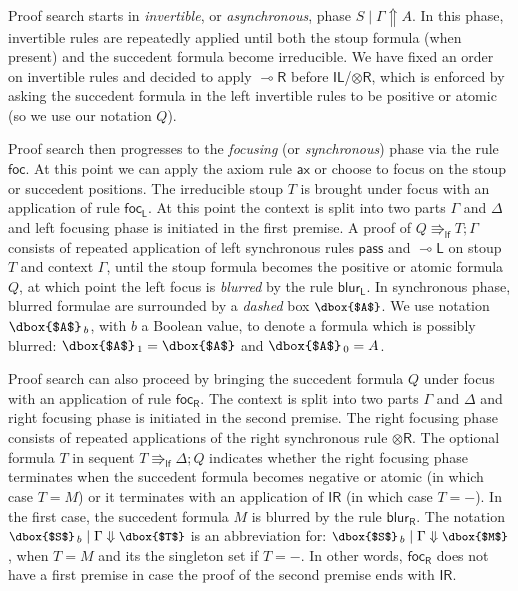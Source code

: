 \documentclass[runningheads]{llncs}
\newcommand{\tr}{\otimes \mathsf{R}}
\newcommand{\lright}{{\multimap}\mathsf{R}}
\newcommand{\lleft}{{\multimap}\mathsf{L}}
\newcommand{\pass}{\mathsf{pass}}
\newcommand{\unitl}{\mathsf{IL}}
\newcommand{\unitr}{\mathsf{IR}}
\newcommand{\otR}{\tr}
\newcommand{\lolliR}{\lright}
\newcommand{\lolliL}{\lleft}
\newcommand{\IL}{\unitl}
\newcommand{\IR}{\unitr}
\newcommand{\ax}{\mathsf{ax}}
\newcommand{\lf}{\Rrightarrow_\mathsf{lf}}
\newcommand{\up}{\Uparrow}
\newcommand{\dn}{\Downarrow}
\newcommand{\focL}{\mathsf{foc_L}}
\newcommand{\foc}{\mathsf{foc}}
\newcommand{\focR}{\mathsf{foc_R}}
\newcommand{\blurL}{\mathsf{blur_L}}
\newcommand{\blurR}{\mathsf{blur_R}}
\begin{document}
Proof search starts in \emph{invertible}, or \emph{asynchronous}, phase $S \mid \Gamma \up A$. In this phase, invertible rules are repeatedly applied until both the stoup formula (when present) and the succedent formula become irreducible. We have fixed an order on invertible rules and decided to apply $\lolliR$ before $\IL$/$\otR$, which is enforced by asking the succedent formula in the left invertible rules to be positive or atomic (so we use our notation $Q$). 

Proof search then progresses to the \emph{focusing} (or \emph{synchronous}) phase via the rule $\foc$. At this point we can apply the axiom rule $\ax$ or choose to focus on the stoup or succedent positions.
The irreducible stoup $T$ is brought under focus with an application of rule $\focL$. At this point the context is split into two parts $\Gamma$ and $\Delta$ and left focusing phase is initiated in the first premise. A proof of $Q \lf T ; \Gamma$ consists of repeated application of left synchronous rules $\pass$ and $\lolliL$ on stoup $T$ and context $\Gamma$, until the stoup formula becomes the positive or atomic formula $Q$, at which point the left focus is \emph{blurred} by the rule $\blurL$. In synchronous phase, blurred formulae are surrounded by a \emph{dashed} box ${\small{\dbox{$A$}}}$. We use notation {\small{$\dbox{$A$}_{\,b}$}}, with $b$ a Boolean value, to denote a formula which is possibly blurred: {\small{$\dbox{$A$}_{\,1} = \dbox{$A$}$}} and {\small{$\dbox{$A$}_{\,0} = A$}}.

Proof search can also proceed by bringing the succedent formula $Q$ under focus with an application of rule $\focR$. The context is split into two parts $\Gamma$ and $\Delta$ and right focusing phase is initiated in the second premise. The right focusing phase consists of repeated applications of the right synchronous rule $\otR$. The optional formula $T$ in sequent $T \lf \Delta ; Q$ indicates whether the right focusing phase terminates when the succedent formula becomes negative or atomic (in which case $T = M$) or it terminates with an application of $\IR$ (in which case $T = -$). In the first case, the succedent formula $M$ is blurred by the rule $\blurR$. The notation $\small\dbox{$S$}_{\, b} \mid \Gamma \dn \dbox{$T$}$ is an abbreviation for: $\small\dbox{$S$}_{\, b} \mid \Gamma \dn \dbox{$M$}$, when $T = M$ and its the singleton set if $T = -$. In other words, $\focR$ does not have a first premise in case the proof of the second premise ends with $\IR$.
\end{document}
